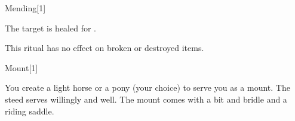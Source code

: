 \begin{spellsection}{Mending}[1]
    \begin{spellheader}
    \end{spellheader}
    \begin{spellcontent}
        \begin{spelltargetinginfo}
        \end{spelltargetinginfo}
        \begin{spelleffects}
            \spelleffect The target is healed for \spelldamage{}.
        \end{spelleffects}
    \end{spellcontent}
    \begin{spellfooter}
        \spellnotes This ritual has no effect on broken or destroyed items.
    \end{spellfooter}
    \begin{spellaugments}
    \end{spellaugments}
\end{spellsection}

\begin{spellsection}{Mount}[1]
    \begin{spellheader}
    \end{spellheader}
    \begin{spellcontent}
        \begin{spelltargetinginfo}
            \spellrng{\rngclose}
        \end{spelltargetinginfo}
        \begin{spelleffects}
            \spelleffect You create a light horse or a pony (your choice) to serve you as a mount. The steed serves willingly and well. The mount comes with a bit and bridle and a riding saddle.
            \spelldur \durext \dismissable
        \end{spelleffects}
    \end{spellcontent}
    \begin{spellfooter}
    \end{spellfooter}
\end{spellsection}

